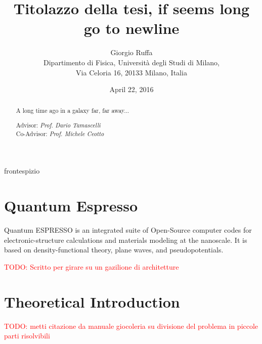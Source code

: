 \documentclass[a4paper,12pt]{article}
\newcommand\mynotes[1]{\begin{flushright}

\textcolor{red}{TODO: #1}\end{flushright}}
\begin{document}
\title{\bf \Huge Titolazzo della tesi, if seems long\\go to newline }


\author{Giorgio Ruffa\\
Dipartimento di Fisica, Universit\`a degli Studi di Milano,\\
Via Celoria 16, 20133 Milano, Italia
}
\date{April 22, 2016} %


 {frontespizio} %

\newpage\qquad
\newpage

\maketitle

\begin{abstract}

A long time ago in a galaxy far, far away...

\vskip0.75cm
\hskip5cm
\parbox[t]{7cm}
{
Advisor: {\it Prof. Dario Tamascelli}\\
Co-Advisor: {\it Prof. Michele Ceotto}
}
\end{abstract}

\newpage
\tableofcontents
\newpage

\section{Quantum Espresso}

Quantum ESPRESSO is an integrated suite of Open-Source computer codes for electronic-structure calculations and materials modeling at the nanoscale.
It is based on density-functional theory, plane waves, and pseudopotentials.

\mynotes{Scritto per girare su un gazilione di architetture}

\section{Theoretical Introduction}\label{model:sec}
\mynotes{metti citazione da manuale giocoleria su divisione del problema in piccole parti risolvibili}
\end{document}

